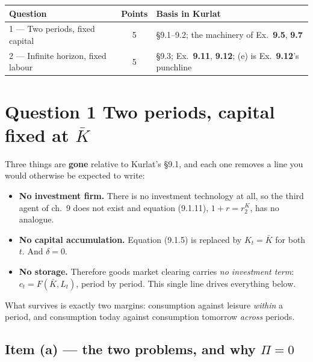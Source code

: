 \documentclass[11pt, a4paper]{article}
\newcommand{\Kb}{\bar K}
\begin{document}
\begin{center}
\small
\begin{tabular}{@{}lcl@{}}
\toprule
\textbf{Question} & \textbf{Points} & \textbf{Basis in Kurlat} \\
\midrule
1 --- Two periods, fixed capital & 5 & \S9.1--9.2; the machinery of Ex.\ \textbf{9.5}, \textbf{9.7} \\
2 --- Infinite horizon, fixed labour & 5 & \S9.3; Ex.\ \textbf{9.11}, \textbf{9.12}; (e) is Ex.\ \textbf{9.12}'s punchline \\
\bottomrule
\end{tabular}
\end{center}

\section{Question 1 \quad Two periods, capital fixed at $\Kb$}

\begin{tcolorbox}[planbox, title={Read the amputation before writing anything}]
\small
Three things are \textbf{gone} relative to Kurlat's \S9.1, and each one removes a line you
would otherwise be expected to write:
\begin{itemize}
\item \textbf{No investment firm.} There is no investment technology at all, so the third
      agent of ch.\ 9 does not exist and equation (9.1.11), $1+r=r^K_2$, has no analogue.
\item \textbf{No capital accumulation.} Equation (9.1.5) is replaced by $K_t=\Kb$ for
      both $t$. And $\delta=0$.
\item \textbf{No storage.} Therefore goods market clearing carries \emph{no investment
      term}: $c_t=F(\Kb,L_t)$, period by period. This single line drives everything below.
\end{itemize}
What survives is exactly two margins: consumption against leisure \emph{within} a period,
and consumption today against consumption tomorrow \emph{across} periods.
\end{tcolorbox}

\subsection*{Item (a) --- the two problems, and why $\Pi=0$}
\end{document}
